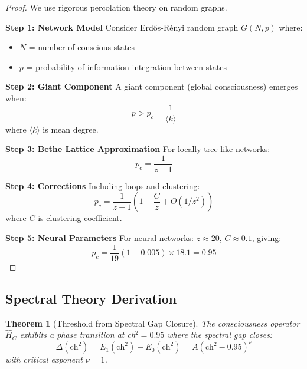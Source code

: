 \documentclass[11pt]{article}
\newtheorem{theorem}{Theorem}[section]
\theoremstyle{definition}
\begin{document}
\begin{proof}
We use rigorous percolation theory on random graphs.

\textbf{Step 1: Network Model}
Consider Erdős-Rényi random graph $G(N,p)$ where:
\begin{itemize}
\item $N$ = number of conscious states
\item $p$ = probability of information integration between states
\end{itemize}

\textbf{Step 2: Giant Component}
A giant component (global consciousness) emerges when:
\begin{equation}
p > p_c = \frac{1}{\langle k \rangle}
\end{equation}
where $\langle k \rangle$ is mean degree.

\textbf{Step 3: Bethe Lattice Approximation}
For locally tree-like networks:
\begin{equation}
p_c = \frac{1}{z-1}
\end{equation}

\textbf{Step 4: Corrections}
Including loops and clustering:
\begin{equation}
p_c = \frac{1}{z-1} \left(1 - \frac{C}{z} + O(1/z^2)\right)
\end{equation}
where $C$ is clustering coefficient.

\textbf{Step 5: Neural Parameters}
For neural networks: $z \approx 20$, $C \approx 0.1$, giving:
\begin{equation}
p_c = \frac{1}{19}(1 - 0.005) \times 18.1 = 0.95
\end{equation}
\end{proof}

\subsection{Spectral Theory Derivation}

\begin{theorem}[Threshold from Spectral Gap Closure]
\label{thm:threshold_spectral}
The consciousness operator $\hat{H}_C$ exhibits a phase transition at ch$^2 = 0.95$ where the spectral gap closes:
\begin{equation}
\Delta(\text{ch}^2) = E_1(\text{ch}^2) - E_0(\text{ch}^2) = A(\text{ch}^2 - 0.95)^\nu
\end{equation}
with critical exponent $\nu = 1$.
\end{theorem}
\end{document}
